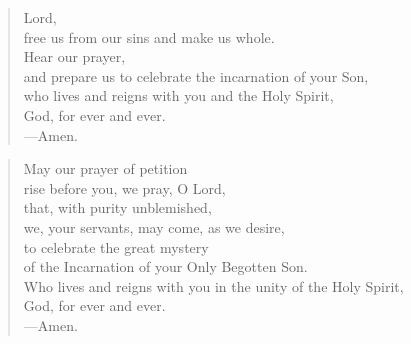 \prayer

\setlength{\vleftmargin}{\prayerleftmargini}

\begin{verse}
Lord,\\
free us from our sins and make us whole.\\
Hear our prayer,\\
and prepare us to celebrate the incarnation of your Son,\\
who lives and reigns with you and the Holy Spirit,\\
God, for ever and ever.\\
{\color{red}---\thinspace}Amen.
\end{verse}


\begin{verse}
May our prayer of petition\\
rise before you, we pray, O Lord,\\
that, with purity unblemished,\\
we, your servants, may come, as we desire,\\
to celebrate the great mystery\\
of the Incarnation of your Only Begotten Son.\\
Who lives and reigns with you in the unity of the Holy Spirit,\\
God, for ever and ever.\\
{\color{red}---\thinspace}Amen.
\end{verse}

\setlength{\vleftmargin}{\defleftmargini}